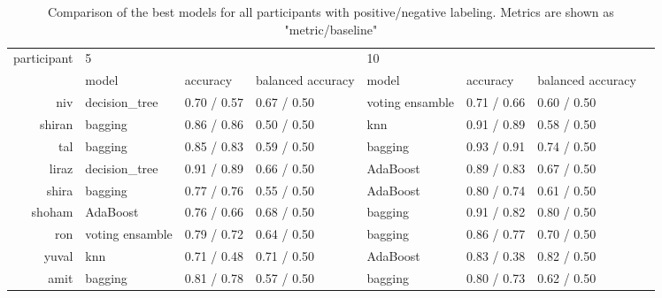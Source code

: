 \documentclass[../main.tex]{subfiles}
\begin{document}
\begin{table}[!h]
    \begin{tabular}{rlllllll}
        \toprule
        participant &      \multicolumn{3}{l}{5} & \multicolumn{3}{l}{10} \\
              &             model &     accuracy & balanced accuracy &            model &     accuracy & balanced accuracy \\
        \midrule
             niv &    decision\_tree &  0.70 / 0.57 &       0.67 / 0.50 &  voting ensamble &  0.71 / 0.66 &       0.60 / 0.50 \\
          shiran &          bagging &  0.86 / 0.86 &       0.50 / 0.50 &              knn &  0.91 / 0.89 &       0.58 / 0.50 \\
             tal &          bagging &  0.85 / 0.83 &       0.59 / 0.50 &          bagging &  0.93 / 0.91 &       0.74 / 0.50 \\
           liraz &    decision\_tree &  0.91 / 0.89 &       0.66 / 0.50 &         AdaBoost &  0.89 / 0.83 &       0.67 / 0.50 \\
           shira &          bagging &  0.77 / 0.76 &       0.55 / 0.50 &         AdaBoost &  0.80 / 0.74 &       0.61 / 0.50 \\
          shoham &         AdaBoost &  0.76 / 0.66 &       0.68 / 0.50 &          bagging &  0.91 / 0.82 &       0.80 / 0.50 \\
             ron &  voting ensamble &  0.79 / 0.72 &       0.64 / 0.50 &          bagging &  0.86 / 0.77 &       0.70 / 0.50 \\
           yuval &              knn &  0.71 / 0.48 &       0.71 / 0.50 &         AdaBoost &  0.83 / 0.38 &       0.82 / 0.50 \\
            amit &          bagging &  0.81 / 0.78 &       0.57 / 0.50 &          bagging &  0.80 / 0.73 &       0.62 / 0.50 \\
        \bottomrule
    \end{tabular}
    \caption{Comparison of the best models for all participants with positive/negative labeling. Metrics are shown as "metric/baseline"}
\end{table}
\end{document}
